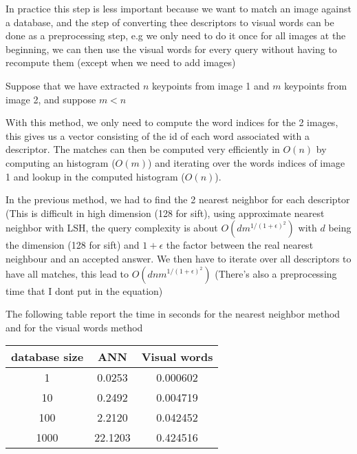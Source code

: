 \documentclass{article}
\begin{document}

In practice this step is less important because we want to match an
image against a database, and the step of converting thee descriptors
to visual words can be done as a preprocessing step, e.g we only need
to do it once for all images at the beginning, we can then use the
visual words for every query without having to recompute them (except
when we need to add images)


Suppose that we have extracted $n$ keypoints from image 1 and $m$
keypoints from image 2, and suppose $m < n$

With this method, we only need to compute the word indices for the 2
images, this gives us a vector consisting of the id of each word
associated with a descriptor. The matches can then be computed very
efficiently in $O(n)$ by computing an histogram ($O(m)$) and iterating
over the words indices of image 1 and lookup in the computed histogram
($O(n)$).

In the previous method, we had to find the 2 nearest neighbor for each
descriptor (This is difficult in high dimension (128 for sift), using
approximate nearest neighbor with LSH, the query complexity is about
$O(d m^{1/(1 + \epsilon)^2})$ with $d$ being the dimension (128 for
sift) and $1 + \epsilon$ the factor between the real nearest neighbour
and an accepted answer. We then have to iterate over all descriptors to
have all matches, this lead to $O(d n m^{1/(1 + \epsilon)^2})$ (There's also
a preprocessing time that I dont put in the equation)


The following table report the time in seconds for the nearest
neighbor method and for the visual words method

\begin{center}
  \begin{tabular}{| c | c | c |}
    \hline
    database size & ANN & Visual words \\
    \hline
    1    & 0.0253  & 0.000602 \\
    10   & 0.2492  & 0.004719 \\
    100  & 2.2120  & 0.042452 \\
    1000 & 22.1203 & 0.424516 \\
    \hline
  \end{tabular}
\end{center}
\end{document}
